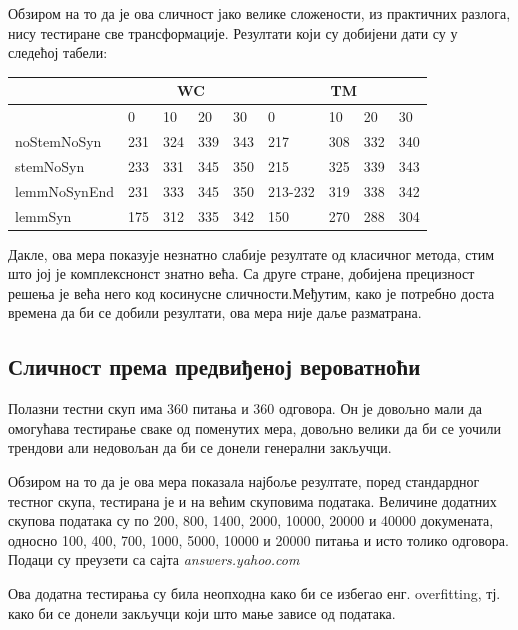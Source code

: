 Обзиром на то да је ова сличност јако велике сложености, из практичних разлога, нису тестиране све трансформације. Резултати који су добијени дати су у следећој табели:

\begin{center}
\begin{tabular}{ | l | l | l | l | l || l | l | l | l | }
\hline
	 &\multicolumn{4}{|c||}{WC}  & \multicolumn{4}{|c|}{TM}  \\ \hline
	 & 0 & 10 & 20 & 30 & 0 & 10 & 20 & 30 \\ \hline
	noStemNoSyn & 231 & 324 & 339 & 343 & 217 & 308 & 332 & 340 \\ \hline
	stemNoSyn & 233 & 331 & 345 & 350 & 215 & 325 & 339 & 343 \\ \hline
	lemmNoSynEnd & 231 & 333 & 345 & 350 & 213-232 & 319 & 338 & 342 \\ \hline
	lemmSyn & 175 & 312 & 335 & 342 & 150 & 270 & 288 & 304 \\ \hline
\end{tabular}
\end{center}


Дакле, ова мера показује незнатно слабије резултате од класичног метода, стим што јој је комплекснонст знатно већа. Са друге стране, добијена прецизност решења је већа него код косинусне сличности.Међутим, како је потребно доста времена да би се добили резултати, ова мера није даље разматрана. 

\subsection{Сличност према предвиђеној вероватноћи}

Полазни тестни скуп има 360 питања и 360 одговора. Он је довољно мали да омогућава тестирање сваке од поменутих мера, довољно велики да би се уочили трендови али недовољан да би се донели генерални закључци. 

Обзиром на то да је ова мера  показала најбоље резултате, поред стандардног тестног скупа, тестирана је и на већим скуповима података. Величине додатних скупова података су по 200, 800, 1400, 2000, 10000, 20000 и 40000 докумената, односно 100, 400, 700, 1000, 5000, 10000 и 20000 питања и исто толико одговора. Подаци су преузети са сајта \textit{answers.yahoo.com}

Ова додатна тестирања су била неопходна како би се избегао енг. overfitting, тј. како би се донели закључци који што мање зависе од података. 

